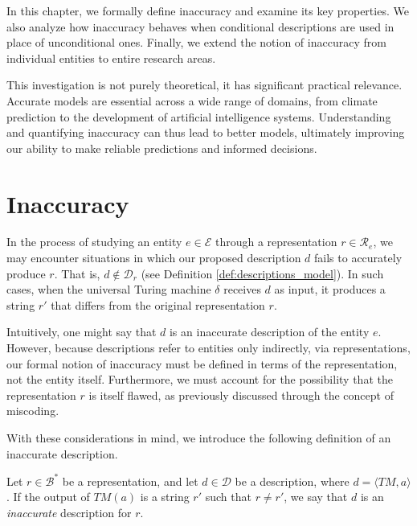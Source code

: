 In this chapter, we formally define inaccuracy and examine its key properties. We also analyze how inaccuracy behaves when conditional descriptions are used in place of unconditional ones. Finally, we extend the notion of inaccuracy from individual entities to entire research areas.

This investigation is not purely theoretical, it has significant practical relevance. Accurate models are essential across a wide range of domains, from climate prediction to the development of artificial intelligence systems. Understanding and quantifying inaccuracy can thus lead to better models, ultimately improving our ability to make reliable predictions and informed decisions.

%
%

\section{Inaccuracy}
\label{sec:inaccuracy:inaccuracy}

In the process of studying an entity $e \in \mathcal{E}$ through a representation $r \in \mathcal{R}_e$, we may encounter situations in which our proposed description $d$ fails to accurately produce $r$. That is, $d \notin \mathcal{D}_r$ (see Definition \ref{def:descriptions_model}). In such cases, when the universal Turing machine $\delta$ receives $d$ as input, it produces a string $r'$ that differs from the original representation $r$.

Intuitively, one might say that $d$ is an inaccurate description of the entity $e$. However, because descriptions refer to entities only indirectly, via representations, our formal notion of inaccuracy must be defined in terms of the representation, not the entity itself. Furthermore, we must account for the possibility that the representation $r$ is itself flawed, as previously discussed through the concept of miscoding.

With these considerations in mind, we introduce the following definition of an inaccurate description.

\begin{definition}
Let $r \in \mathcal{B}^\ast$ be a representation, and let $d \in \mathcal{D}$ be a description, where $d = \langle TM, a \rangle$. If the output of $TM(a)$ is a string $r'$ such that $r \neq r'$, we say that $d$ is an \emph{inaccurate} description for $r$.
\end{definition}

